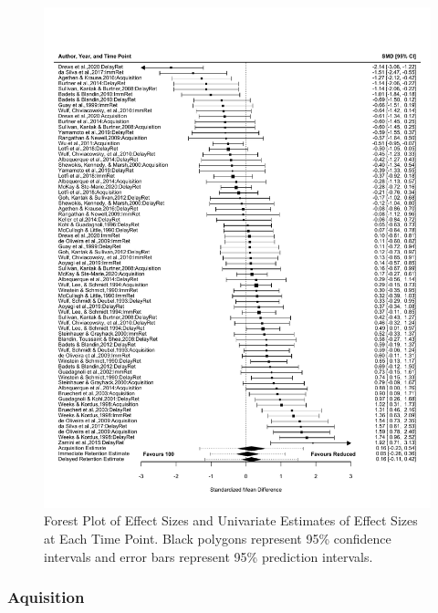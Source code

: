 \documentclass[
  english,
  man,mask,floatsintext]{apa7}
\begin{document}
\begin{figure}

{\centering \includegraphics[height=1.5\textheight]{../../figures/fig3} 

}

\caption{Forest Plot of Effect Sizes and Univariate Estimates of Effect Sizes at Each Time Point. Black polygons represent 95\% confidence intervals and error bars represent 95\% prediction intervals.}\label{fig:fig3}
\end{figure}

\hypertarget{aquisition}{%
\subsubsection{Aquisition}\label{aquisition}}
\end{document}
